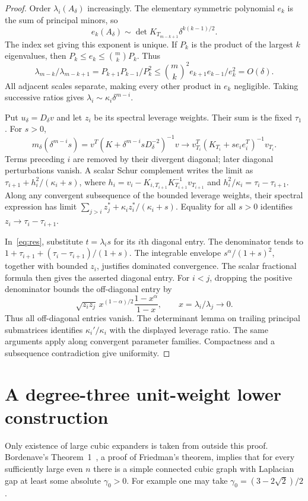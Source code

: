 \documentclass[11pt]{article}
\begin{document}
\begin{proof}
Order $\lambda_i(A_\delta)$ increasingly. The elementary symmetric
polynomial $e_k$ is the sum of principal minors, so
\[
 e_k(A_\delta)\sim\det K_{T_{m-k+1}}\delta^{k(k-1)/2}.
\]
The index set giving this exponent is unique. If $P_k$ is the product
of the largest $k$ eigenvalues, then $P_k\le e_k\le\binom mk P_k$.
Thus
\[
 \lambda_{m-k}/\lambda_{m-k+1}
 =P_{k+1}P_{k-1}/P_k^2
 \le\binom mk^2 e_{k+1}e_{k-1}/e_k^2=O(\delta).
\]
All adjacent scales separate, making every other product in $e_k$
negligible. Taking successive ratios gives
$\lambda_i\sim\kappa_i\delta^{m-i}$.

Put $u_\delta=D_\delta v$ and let $z_i$ be its spectral leverage
weights. Their sum is the fixed $\tau_1$. For $s>0$,
\[
 m_\delta(\delta^{m-i}s)
 =v^T(K+\delta^{m-i}sD_\delta^{-2})^{-1}v
 \longrightarrow v_{T_i}^T(K_{T_i}+se_ie_i^T)^{-1}v_{T_i}.
\]
Terms preceding $i$ are removed by their divergent diagonal; later
diagonal perturbations vanish. A scalar Schur complement writes the
limit as
$\tau_{i+1}+h_i^2/(\kappa_i+s)$, where
$h_i=v_i-K_{i,T_{i+1}}K_{T_{i+1}}^{-1}v_{T_{i+1}}$ and
$h_i^2/\kappa_i=\tau_i-\tau_{i+1}$.
Along any convergent subsequence of the bounded leverage weights,
their spectral expression has limit
$\sum_{j>i}z_j^*+\kappa_i z_i^*/(\kappa_i+s)$.
Equality for all $s>0$ identifies
$z_i\to\tau_i-\tau_{i+1}$.

In~\eqref{eq:res}, substitute $t=\lambda_i s$ for its $i$th diagonal
entry. The denominator tends to
$1+\tau_{i+1}+(\tau_i-\tau_{i+1})/(1+s)$.
The integrable envelope $s^\alpha/(1+s)^2$, together with bounded
$z_i$, justifies dominated convergence. The scalar fractional formula
then gives the asserted diagonal entry. For $i<j$, dropping the positive
denominator bounds the off-diagonal entry by
\[
 \sqrt{z_i z_j}\,x^{(1-\alpha)/2}\frac{1-x^\alpha}{1-x},\qquad
 x=\lambda_i/\lambda_j\longrightarrow0.
\]
Thus all off-diagonal entries vanish. The determinant lemma on trailing
principal submatrices identifies $\kappa_i'/\kappa_i$ with the displayed
leverage ratio. The same arguments apply along convergent parameter
families. Compactness and a subsequence contradiction give uniformity.
\end{proof}

\section{A degree-three unit-weight lower construction}
Only existence of large cubic expanders is taken from outside this
proof. Bordenave's Theorem~1~\cite{Bordenave}, a proof of Friedman's
theorem, implies that for every sufficiently large even $n$ there is a
simple connected cubic graph with Laplacian gap at least some absolute
$\gamma_0>0$. For example one may take
$\gamma_0=(3-2\sqrt2)/2$.
\end{document}

